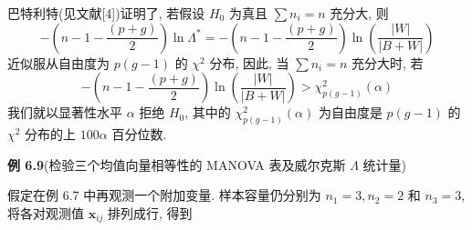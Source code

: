 巴特利特(见文献[4])证明了, 若假设 $H_0$ 为真且 $\sum n_i=n$ 充分大, 则
\label{eq:6-43}
\begin{equation}
-\left(n-1-\frac{(p+g)}{2}\right)\ln\Lambda^*
=-\left(n-1-\frac{(p+g)}{2}\right)\ln\left(\frac{|W|}{|B+W|}\right)
\tag{6-43}
\end{equation}
近似服从自由度为 $p(g-1)$ 的 $\chi^2$ 分布, 因此, 当 $\sum n_i=n$ 充分大时, 若
\label{eq:6-44}
\begin{equation}
-\left(n-1-\frac{(p+g)}{2}\right)\ln\left(\frac{|W|}{|B+W|}\right)>\chi^2_{p(g-1)}(\alpha)
\tag{6-44}
\end{equation}
我们就以显著性水平 $\alpha$ 拒绝 $H_0$, 其中的 $\chi^2_{p(g-1)}(\alpha)$ 为自由度是 $p(g-1)$ 的 $\chi^2$ 分布的上 $100\alpha$ 百分位数.

\noindent\textbf{例 6.9}\quad (检验三个均值向量相等性的 MANOVA 表及威尔克斯 $\Lambda$ 统计量)

假定在例 6.7 中再观测一个附加变量. 样本容量仍分别为 $n_1=3,n_2=2$ 和 $n_3=3$, 将各对观测值 $\mathbf{x}_{ij}$ 排列成行, 得到
